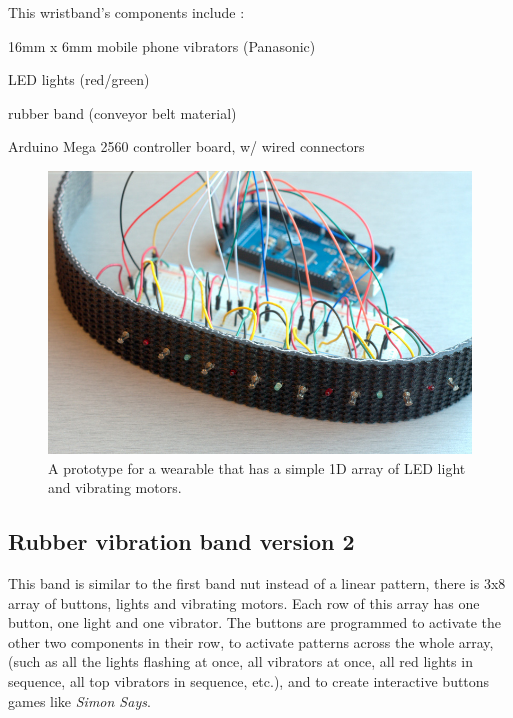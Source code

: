 \documentclass{chi-ext}
\begin{document}
This wristband's components include	:
\begin{inparaenum}
\item 16mm x 6mm mobile phone vibrators (Panasonic)
\item LED lights (red/green)
\item rubber band (conveyor belt material)
\item Arduino Mega 2560 controller board, w/ wired connectors
\end{inparaenum}

\begin{figure}
  \begin{center}
  \includegraphics[width=\columnwidth]{images/P1130394.jpg}
  \caption{A prototype for a wearable that has a simple 1D array of LED light and vibrating motors.}
  \label{fig:marginparsample}
  \end{center}  
\end{figure}

\subsection{Rubber vibration band version 2}
This band is similar to the first band nut instead of a linear pattern, there is 3x8 array of buttons, lights and vibrating motors. Each row of this array has one button, one light and one vibrator. The buttons are programmed to activate the other two components in their row, to activate patterns across the whole array, (such as all the lights flashing at once, all vibrators at once, all red lights in sequence, all top vibrators in sequence, etc.), and to create interactive buttons games like \emph{Simon Says}.
\end{document}
